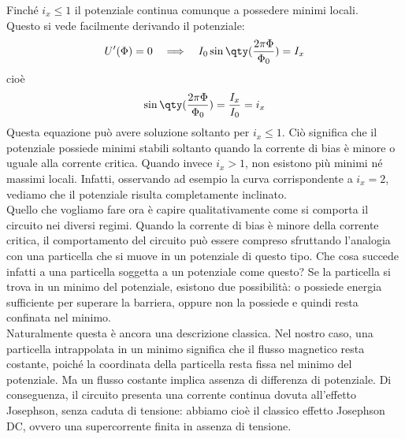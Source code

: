 Finché $i_x\leq1$ il potenziale continua comunque a possedere minimi locali.\\
Questo si vede facilmente derivando il potenziale:
\begin{equation*}
    U'(\Phi)=0
    \quad\Longrightarrow\quad
    I_0 \sin{\qty(\frac{2\pi\Phi}{\Phi_0})}
    =I_x
\end{equation*}
cioè
\begin{equation*}
    \sin{\qty(\frac{2\pi\Phi}{\Phi_0})}
    =\frac{I_x}{I_0}
    =i_x
\end{equation*}
Questa equazione può avere soluzione soltanto per $i_x\leq1$. Ciò significa che il potenziale possiede minimi stabili soltanto quando la corrente di bias è minore o uguale alla corrente critica. Quando invece $i_x>1$, non esistono più minimi né massimi locali. Infatti, osservando ad esempio la curva corrispondente a $i_x=2$, vediamo che il potenziale risulta completamente inclinato.\\
Quello che vogliamo fare ora è capire qualitativamente come si comporta il circuito nei diversi regimi. Quando la corrente di bias è minore della corrente critica, il comportamento del circuito può essere compreso sfruttando l'analogia con una particella che si muove in un potenziale di questo tipo. Che cosa succede infatti a una particella soggetta a un potenziale come questo? Se la particella si trova in un minimo del potenziale, esistono due possibilità: o possiede energia sufficiente per superare la barriera, oppure non la possiede e quindi resta confinata nel minimo.\\
Naturalmente questa è ancora una descrizione classica. Nel nostro caso, una particella intrappolata in un minimo significa che il flusso magnetico resta costante, poiché la coordinata della particella resta fissa nel minimo del potenziale. Ma un flusso costante implica assenza di differenza di potenziale. Di conseguenza, il circuito presenta una corrente continua dovuta all'effetto Josephson, senza caduta di tensione: abbiamo cioè il classico effetto Josephson DC, ovvero una supercorrente finita in assenza di tensione.
